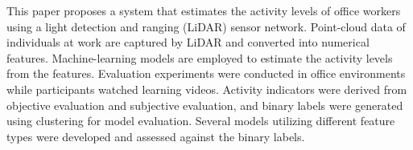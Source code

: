 This paper proposes a system that estimates the activity levels of office workers using a light detection and ranging (LiDAR) sensor network.
Point-cloud data of individuals at work are captured by LiDAR and converted into numerical features.
Machine-learning models are employed to estimate the activity levels from the features.
Evaluation experiments were conducted in office environments while participants watched learning videos.
Activity indicators were derived from objective evaluation and subjective evaluation, and binary labels were generated using clustering for model evaluation.
Several models utilizing different feature types were developed and assessed against the binary labels.
